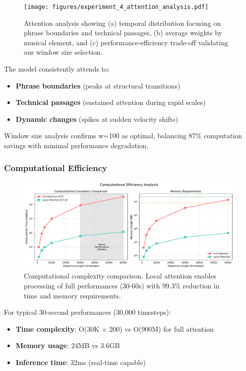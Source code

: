 \begin{figure}[h]
\centering
\texttt{[image: figures/experiment\_4\_attention\_analysis.pdf]}
\caption{Attention analysis showing (a) temporal distribution focusing on phrase boundaries and technical passages, (b) average weights by musical element, and (c) performance-efficiency trade-off validating our window size selection.}
\label{fig:attention}
\end{figure}

The model consistently attends to:
\begin{itemize}
\item \textbf{Phrase boundaries} (peaks at structural transitions)
\item \textbf{Technical passages} (sustained attention during rapid scales)
\item \textbf{Dynamic changes} (spikes at sudden velocity shifts)
\end{itemize}

Window size analysis confirms w=100 as optimal, balancing 87\% computation savings with minimal performance degradation.

\subsubsection{Computational Efficiency}

\begin{figure}[h]
\centering
\includegraphics[width=\columnwidth]{figures/experiment_5_efficiency_analysis.pdf}
\caption{Computational complexity comparison. Local attention enables processing of full performances (30-60s) with 99.3\% reduction in time and memory requirements.}
\label{fig:efficiency}
\end{figure}

For typical 30-second performances (30,000 timesteps):
\begin{itemize}
\item \textbf{Time complexity}: O(30K × 200) vs O(900M) for full attention
\item \textbf{Memory usage}: 24MB vs 3.6GB
\item \textbf{Inference time}: 32ms (real-time capable)
\end{itemize}

